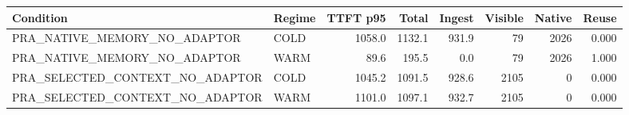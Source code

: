 \begin{tabular}{llrrrrrr}
\toprule
Condition & Regime & TTFT p95 & Total & Ingest & Visible & Native & Reuse \\
\midrule
PRA\_NATIVE\_MEMORY\_NO\_ADAPTOR & COLD & 1058.0 & 1132.1 & 931.9 & 79 & 2026 & 0.000 \\
PRA\_NATIVE\_MEMORY\_NO\_ADAPTOR & WARM & 89.6 & 195.5 & 0.0 & 79 & 2026 & 1.000 \\
PRA\_SELECTED\_CONTEXT\_NO\_ADAPTOR & COLD & 1045.2 & 1091.5 & 928.6 & 2105 & 0 & 0.000 \\
PRA\_SELECTED\_CONTEXT\_NO\_ADAPTOR & WARM & 1101.0 & 1097.1 & 932.7 & 2105 & 0 & 0.000 \\
\bottomrule
\end{tabular}
